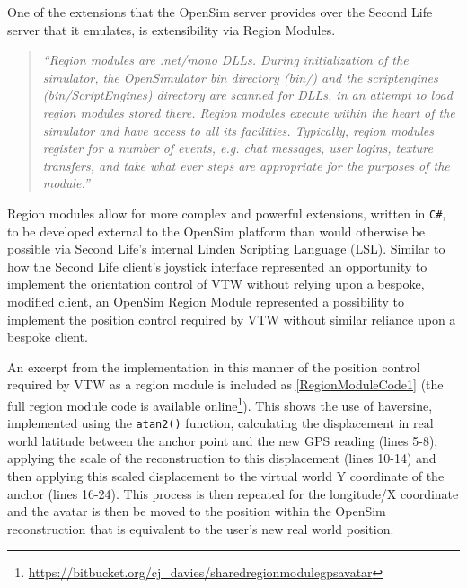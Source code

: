 \newcommand{\RegionModuleCodeFootnote}{\footnote{\url{https://bitbucket.org/cj_davies/sharedregionmodulegpsavatar}}}


One of the extensions that the OpenSim server provides over the Second Life server that it emulates, is extensibility via Region Modules.

\begin{quotation}
	\textit{``Region modules are .net/mono DLLs. During initialization of the simulator, the OpenSimulator bin directory (bin/) and the scriptengines (bin/ScriptEngines) directory are scanned for DLLs, in an attempt to load region modules stored there. Region modules execute within the heart of the simulator and have access to all its facilities. Typically, region modules register for a number of events, e.g. chat messages, user logins, texture transfers, and take what ever steps are appropriate for the purposes of the module.''}\RegionModuleFootnote{}
\end{quotation}

Region modules allow for more complex and powerful extensions, written in \texttt{C\#}, to be developed external to the OpenSim platform than would otherwise be possible via Second Life's internal Linden Scripting Language (LSL). Similar to how the Second Life client's joystick interface represented an opportunity to implement the orientation control of VTW without relying upon a bespoke, modified client, an OpenSim Region Module represented a possibility to implement the position control required by VTW without similar reliance upon a bespoke client.

An excerpt from the implementation in this manner of the position control required by VTW as a region module is included as \ref{RegionModuleCode1} (the full region module code is available online\RegionModuleCodeFootnote{}). This shows the use of haversine, implemented using the \texttt{atan2()} function, calculating the displacement in real world latitude between the anchor point and the new GPS reading (lines 5-8), applying the scale of the reconstruction to this displacement (lines 10-14) and then applying this scaled displacement to the virtual world Y coordinate of the anchor (lines 16-24). This process is then repeated for the longitude/X coordinate and the avatar is then be moved to the position within the OpenSim reconstruction that is equivalent to the user's new real world position.

